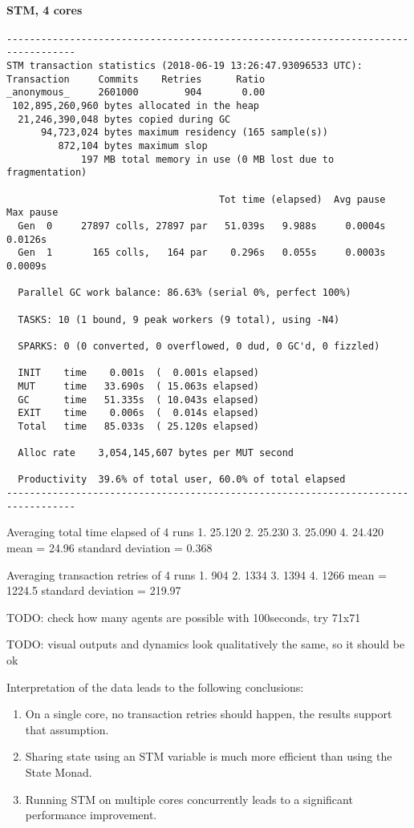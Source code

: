 \paragraph{STM, 4 cores}
\begin{verbatim}
----------------------------------------------------------------------------------
STM transaction statistics (2018-06-19 13:26:47.93096533 UTC):
Transaction     Commits    Retries      Ratio
_anonymous_     2601000        904       0.00
 102,895,260,960 bytes allocated in the heap
  21,246,390,048 bytes copied during GC
      94,723,024 bytes maximum residency (165 sample(s))
         872,104 bytes maximum slop
             197 MB total memory in use (0 MB lost due to fragmentation)

                                     Tot time (elapsed)  Avg pause  Max pause
  Gen  0     27897 colls, 27897 par   51.039s   9.988s     0.0004s    0.0126s
  Gen  1       165 colls,   164 par    0.296s   0.055s     0.0003s    0.0009s

  Parallel GC work balance: 86.63% (serial 0%, perfect 100%)

  TASKS: 10 (1 bound, 9 peak workers (9 total), using -N4)

  SPARKS: 0 (0 converted, 0 overflowed, 0 dud, 0 GC'd, 0 fizzled)

  INIT    time    0.001s  (  0.001s elapsed)
  MUT     time   33.690s  ( 15.063s elapsed)
  GC      time   51.335s  ( 10.043s elapsed)
  EXIT    time    0.006s  (  0.014s elapsed)
  Total   time   85.033s  ( 25.120s elapsed)

  Alloc rate    3,054,145,607 bytes per MUT second

  Productivity  39.6% of total user, 60.0% of total elapsed
----------------------------------------------------------------------------------
\end{verbatim}
  
Averaging total time elapsed of 4 runs 
1. 25.120
2. 25.230
3. 25.090
4. 24.420
mean = 24.96
standard deviation = 0.368

Averaging transaction retries of 4 runs
1. 904
2. 1334
3. 1394
4. 1266
mean = 1224.5
standard deviation = 219.97

TODO: check how many agents are possible with 100seconds, try 71x71

TODO: visual outputs and dynamics look qualitatively the same, so it should be ok

Interpretation of the data leads to the following conclusions:
\begin{enumerate}
	\item On a single core, no transaction retries should happen, the results support that assumption.
	\item Sharing state using an STM variable is much more efficient than using the State Monad.
	\item Running STM on multiple cores concurrently leads to a significant performance improvement.
\end{enumerate}

